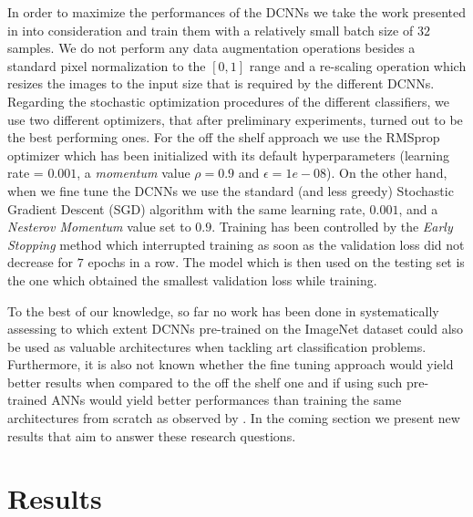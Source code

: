 \documentclass[runningheads]{llncs}
\begin{document}
In order to maximize the performances of the DCNNs we take the work presented in \cite{masters2018revisiting} into consideration and train them with a relatively small batch size of $32$ samples. We do not perform any data augmentation operations besides a standard pixel normalization to the $[0, 1]$ range and a re-scaling operation which resizes the images to the input size that is required by the different DCNNs. Regarding the stochastic optimization procedures of the different classifiers, we use two different optimizers, that after preliminary experiments, turned out to be the best performing ones. For the off the shelf approach we use the RMSprop optimizer \cite{tieleman2012lecture} which has been initialized with its default hyperparameters (learning rate = $0.001$, a \textit{momentum} value $\rho = 0.9$ and $\epsilon =1e-08$). On the other hand, when we fine tune the DCNNs we use the standard (and less greedy) Stochastic Gradient Descent (SGD) algorithm with the same learning rate, $0.001$, and a \textit{Nesterov Momentum} value set to $0.9$.
Training has been controlled by the \textit{Early Stopping} method \cite{caruana2001overfitting} which interrupted training as soon as the validation loss did not decrease for $7$ epochs in a row. The model which is then used on the testing set is the one which obtained the smallest validation loss while training.

To the best of our knowledge, so far no work has been done in systematically assessing to which extent DCNNs pre-trained on the ImageNet dataset could also be used as valuable architectures when tackling art classification problems. Furthermore, it is also not known whether the fine tuning approach would yield better results when compared to the off the shelf one and if using such pre-trained ANNs would yield better performances than training the same architectures from scratch as observed by \cite{kornblith2018better}. In the coming section we present new results that aim to answer these research questions.


\section{Results}
\label{sec:results}
\end{document}
